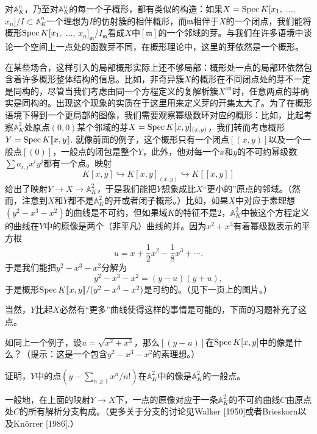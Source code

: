 对$\mathbb{A}_K^n$，乃至对$\mathbb{A}_K^n$的每一个子概形，都有类似的构造：如果$X=\operatorname{Spec} K[x_1,$ $\dots$, $x_n]/I\subset \mathbb{A}_K^n$一个理想为$I$的仿射簇的相伴概形，而$\mathfrak{m}$相伴于$X$的一个闭点，我们能将概形$\operatorname{Spec} K[x_1,$ $\dots$, $x_n]_\mathfrak{m}/I_{\mathfrak{m}}$看成$X$中$[\mathfrak{m}]$的一个邻域的芽。与我们在许多语境中谈论一个空间上一点处的函数芽不同，在概形理论中，这里的芽依然是一个概形。

在某些场合，这样引入的局部概形实际上还不够局部：概形处一点的局部环依然包含着许多概形整体结构的信息。比如，非奇异簇$X$的概形在不同闭点处的芽不一定是同构的，尽管当我们考虑由同一个方程定义的复解析簇$X^{\text{an}}$时，任意两点的芽确实是同构的。出现这个现象的实质在于这里用来定义芽的开集太大了。为了在概形语境下得到一个更局部的图像，我们需要观察幂级数环对应的概形：比如，比起考察$\mathbb{A}_K^2$处原点$(0,0)$某个邻域的芽$X=\operatorname{Spec} K[x,y]_{(x,y)}$，我们转而考虑概形$Y=\operatorname{Spec} K [\![x,y]\!]$. 就像前面的例子，这个概形只有一个闭点$[(x,y)]$以及一个一般点$[(0)]$，一般点的闭包是整个$Y$，此外，他对每一个$x$和$y$的不可约幂级数$\sum a_{i,j}x^iy^j$都有一个点。映射
\[
	K[x,y]\hookrightarrow K[x,y]_{(x,y)}\hookrightarrow K[\![x,y]\!]
\]
给出了映射$Y\to X\to \mathbb{A}_K^2$，于是我们能把$Y$想象成比$X$“更小的”原点的邻域。（然而，注意到$X$和$Y$都不是$\mathbb{A}_K^2$的开或者闭子概形。）比如，如果$X$中对应于素理想$(y^2-x^3-x^2)$的曲线是不可约，但如果域$K$的特征不是$2$，$\mathbb{A}_K^2$中被这个方程定义的曲线在$Y$中的原像是两个（非平凡）曲线的并。因为$x^2+x^3$有着幂级数表示的平方根
\[
	u=x+\frac{1}{2}x^2-\frac{1}{8}x^3+\cdots.
\]
于是我们能把$y^2-x^3-x^2$分解为
\[
	y^2-x^3-x^2=(y-u)(y+u),
\]
于是概形$\operatorname{Spec}  K[\![x,y]\!]/(y^2-x^3-x^2)$是可约的。（见下一页上的图片。）


当然，$Y$比起$X$必然有“更多”曲线使得这样的事情是可能的，下面的习题补充了这点。

\begin{exe}
	\begin{compactenum}[(a)]
		\item 如同上一个例子，设$u=\sqrt{x^2+x^3}$，那么$[(y-u)]$在$\operatorname{Spec} K[x,y]$中的像是什么？（提示：这是一个包含$y^2-x^3-x^2$的素理想。）
		\item 证明，$Y$中的点$(y-\sum_{n\geq 1}x^n/n!)$在$\mathbb{A}_K^2$中的像是$\mathbb{A}_K^2$的一般点。
	\end{compactenum}
\end{exe}

一般地，在上面的映射$Y\to X$下，一点的原像对应于一条$\mathbb{A}_K^2$的不可约曲线$C$由原点处$C$的所有解析分支构成。（更多关于分支的讨论见Walker [1950]或者Brieskorn以及Kn\"{o}rrer [1986].）

